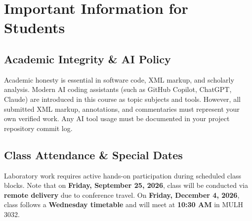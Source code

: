 \documentclass[12pt,oncampus]{article}
\begin{document}
\begin{stfxevaluation}



\end{stfxevaluation}

\section*{Important Information for Students}

\subsection*{Academic Integrity \& AI Policy}

Academic honesty is essential in software code, XML markup, and scholarly analysis. Modern AI coding assistants (such as GitHub Copilot, ChatGPT, Claude) are introduced in this course as topic subjects and tools. However, all submitted XML markup, annotations, and commentaries must represent your own verified work. Any AI tool usage must be documented in your project repository commit log.

\subsection*{Class Attendance \& Special Dates}

Laboratory work requires active hands-on participation during scheduled class blocks. Note that on \textbf{Friday, September 25, 2026}, class will be conducted via \textbf{remote delivery} due to conference travel. On \textbf{Friday, December 4, 2026}, class follows a \textbf{Wednesday timetable} and will meet at \textbf{10:30 AM} in MULH 3032.
\end{document}
